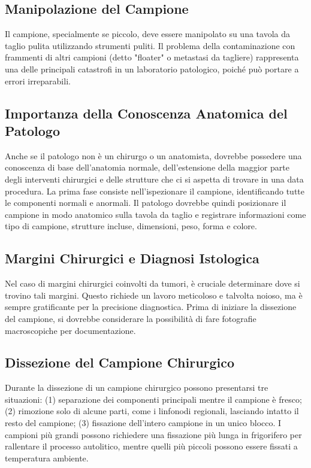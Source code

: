 \subsection{Manipolazione del Campione}
Il campione, specialmente se piccolo, deve essere manipolato su una tavola da taglio pulita utilizzando strumenti puliti. Il problema della contaminazione con frammenti di altri campioni (detto "floater" o metastasi da tagliere) rappresenta una delle principali catastrofi in un laboratorio patologico, poiché può portare a errori irreparabili.

\subsection{Importanza della Conoscenza Anatomica del Patologo}
Anche se il patologo non è un chirurgo o un anatomista, dovrebbe possedere una conoscenza di base dell'anatomia normale, dell'estensione della maggior parte degli interventi chirurgici e delle strutture che ci si aspetta di trovare in una data procedura. La prima fase consiste nell'ispezionare il campione, identificando tutte le componenti normali e anormali. Il patologo dovrebbe quindi posizionare il campione in modo anatomico sulla tavola da taglio e registrare informazioni come tipo di campione, strutture incluse, dimensioni, peso, forma e colore.

\subsection{Margini Chirurgici e Diagnosi Istologica}
Nel caso di margini chirurgici coinvolti da tumori, è cruciale determinare dove si trovino tali margini. Questo richiede un lavoro meticoloso e talvolta noioso, ma è sempre gratificante per la precisione diagnostica. Prima di iniziare la dissezione del campione, si dovrebbe considerare la possibilità di fare fotografie macroscopiche per documentazione.

\subsection{Dissezione del Campione Chirurgico}
Durante la dissezione di un campione chirurgico possono presentarsi tre situazioni: (1) separazione dei componenti principali mentre il campione è fresco; (2) rimozione solo di alcune parti, come i linfonodi regionali, lasciando intatto il resto del campione; (3) fissazione dell'intero campione in un unico blocco. I campioni più grandi possono richiedere una fissazione più lunga in frigorifero per rallentare il processo autolitico, mentre quelli più piccoli possono essere fissati a temperatura ambiente.

